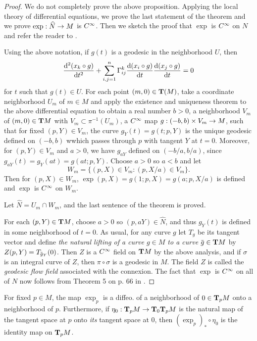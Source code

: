 \documentclass[../main]{subfiles}
\begin{document}
\begin{proof}
We do not completely prove the above proposition. Applying the local theory of differential equations, we prove the last statement of the theorem and we prove $\exp : \widehat N \functionMaps M$ is $\CInfty$. Then we sketch the proof that $\exp$ is $\CInfty$ on $N$ and refer the reader to \cite{lang2014introduction}. 

Using the above notation, if $g(t)$ is a geodesic in the neighborhood $U$, then
\[ \dv{^2(x_k \circ g)}{t^2} + \sum_{i, j= 1}^n \Gamma_{i j}^k \dv{(x_i \circ g)}{t} \dv{(x_j \circ g)}{t} = 0 \]
for $t$ such that $g(t) \in U$. For each point $(m, 0) \in \tangentbundle(M)$, take a coordinate neighborhood $U_m$ of $m \in M$ and apply the existence and uniqueness theorem to the above differential equation to obtain a real number $b>0$, a neighborhood $V_m$ of $(m, 0)\in \tangentbundle{M}$ with $V_m \subset \pi^{-1}(U_m)$, a $\CInfty$ map $g : (-b, b) \times V_m \functionMaps M$, such that for fixed $(p, Y)\in V_m$, the curve $g_Y(t) = g(t; p, Y)$ is the unique geodesic defined on $(-b, b)$ wwhich passes through $p$ with tangent $Y$ at $t=0$. Moreover, for $(p, Y) \in V_m$ and $a>0$, we have $g_{aY}$ defined on $(-b/a, b/a)$, since \newline $g_{aY}(t) = g_Y(at) = g(at ; p, Y)$. Choose $a>0$ so $a < b$ and let \[W_m = \{ (p,X) \in V_m : (p, X/a)\in V_m\}.\]Then for $(p, X)\in W_m$, $\exp(p, X) = g(1; p, X) = g(a; p, X/a)$ is defined and $\exp$ is $\CInfty$ on $W_m$. 

Let $\widehat N = U_m\cap W_m$, and the last sentence of the theorem is proved.

For each $(p, Y)\in \tangentbundle{M}$, choose $a>0$ so $(p, aY) \in \widehat N$, and thus $g_Y(t)$ is defined in some neighborhood of $t=0$. As usual, for any curve $g$ let $T_g$ be its tangent vector and define \emph{the natural lifting of a curve $g \in M$ to a curve $\xoverline g\in \tangentbundle{M}$} by $Z(p,Y) = T_{\xoverline g_Y}(0)$. Then $Z$ is a $\CInfty$ field on $\tangentbundle M$ by the above analysis, and if $\sigma$ is an integral curve of $Z$, then $\pi \circ \sigma$ is a geodesic in $M$. The field $Z$ is called the \emph{geodesic flow field} associated with the connexion. The fact that $\exp$ is $\CInfty$ on all of $N$ now follows from Theorem 5 on p. 66 in \cite{lang2014introduction}. 
\end{proof}



\begin{corollary} \label{cor:ch9.3.2}
For fixed $p\in M$, the map $\exp_p$ is a diffeo. of a neighborhood of $0 \in \tangentspace{M}{p}$ onto a neighborhood of $p$. Furthermore, if $\eta_0 : \tangentspace{M}{p} \functionMaps \tangentspace{\tangentspace{M}{p}}{0}$ is the natural map of the tangent space at $p$ onto \emph{its} tangent space at $0$, then $(\exp_p)_\ast\circ\eta_0$ is the identity map on $\tangentspace{M}{p}$. 
\end{corollary}
\end{document}
